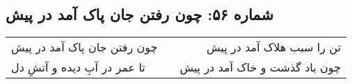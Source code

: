 \begin{center}
\section*{شماره ۵۶: چون رفتن جان پاک آمد در پیش}
\label{sec:056}
\begin{longtable}{l p{0.5cm} r}
چون رفتن جان پاک آمد در پیش
&&
تن را سبب هلاک آمد در پیش
\\
تا عمر در آبِ دیده و آتشِ دل
&&
چون باد گذشت و خاک آمد در پیش
\\
\end{longtable}
\end{center}
